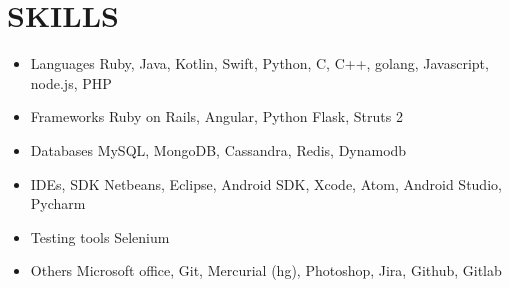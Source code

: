 \documentclass[11pt,a4paper]{article}
\begin{document}
\section*{SKILLS}
\TabPositions{3cm}
\begin{itemize}[noitemsep]
\item Languages \tab Ruby, Java, Kotlin, Swift, Python, C, C++, golang, Javascript, node.js, PHP
\item Frameworks \tab Ruby on Rails, Angular, Python Flask, Struts 2
\item Databases \tab MySQL, MongoDB, Cassandra, Redis, Dynamodb
\item IDEs, SDK \tab Netbeans, Eclipse, Android SDK, Xcode, Atom, Android Studio, Pycharm
\item Testing tools \tab Selenium
\item Others \tab Microsoft office, Git, Mercurial (hg), Photoshop, Jira, Github, Gitlab
\end{itemize}
\end{document}
